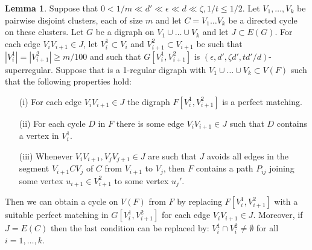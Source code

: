 \documentclass[10pt,letterpaper, reqno]{amsart}
\theoremstyle{definition}
\newtheorem{lemma}[thm]{Lemma}
\numberwithin{equation}{section}
\begin{document}
\begin{lemma}\label{6.4}
	Suppose that $0 < 1/m \ll d' \ll \epsilon \ll d \ll \zeta, 1/t \leq 1/2$. Let $V_1, \dots, V_k$ be pairwise disjoint clusters, each of size $m$ and let $C=V_1\dots V_k$ be a directed cycle on these clusters. Let $G$ be a digraph on $V_1 \cup \dots \cup V_k$ and let $J\subset E(G)$. For each edge $V_{i}V_{i+1} \in J$, let $V_i^1 \subset V_i$ and $V_{i+1}^2 \subset V_{i+1}$ be such that $|V_i^1|=|V_{i+1}^2| \geq m/100$ and such that $G[V_i^1, V^2_{i+1}]$ is $(\epsilon, d',\zeta d', td'/d)$-superregular. Suppose that is a 1-regular digraph with $V_1 \cup \dots \cup V_k \subset V(F)$ such that the following properties hold:
	\begin{enumerate}
		\item[(i)] For each edge $V_i V_{i+1} \in J$ the digraph $F[V_i^1, V_{i+1}^2]$ is a perfect matching.
		\item[(ii)] For each cycle $D$ in $F$ there is some edge $V_i V_{i+1} \in J$ such that $D$ contains a vertex in $V_i^1$.
		\item[(iii)] Whenever $V_i V_{i+1}, V_j V_{j+1} \in J$ are such that $J$ avoids all edges in the segment $V_{i+1}CV_j$ of $C$ from $V_{i+1}$ to $V_j$, then $F$ contains a path $P_{ij}$ joining some vertex $u_{i+1} \in V^2_{i+1}$ to some vertex $u_j'$.
	\end{enumerate}
	Then we can obtain a cycle on $V(F)$ from $F$ by replacing $F[V_{i}^1, V^2_{i+1}]$ with a suitable perfect matching in $G[V_i^1,V_{i+1}^2]$ for each edge $V_i V_{i+1} \in J$. Moreover, if $J=E(C)$ then the last condition can be replaced by: $V_i ^1 \cap V_i ^2 \neq \emptyset $ for all $i=1,\dots, k$.
\end{lemma}
\end{document}
